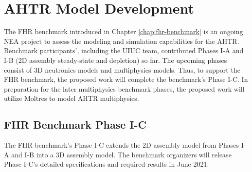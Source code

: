 \section{AHTR Model Development}
The \gls{FHR} benchmark introduced in Chapter \ref{chap:fhr-benchmark} is an 
ongoing \gls{NEA} project to assess the modeling and simulation capabilities 
for the \gls{AHTR}. 
Benchmark participants', including the \gls{UIUC} team, contributed Phases I-A 
and I-B (2D assembly steady-state and depletion) so far.  
The upcoming phases consist of 3D neutronics models and multiphysics models. 
Thus, to support the \gls{FHR} benchmark, the proposed work will complete the 
benchmark's Phase I-C.
In preparation for the later multiphysics benchmark phases, the proposed 
work will utilize Moltres to model \gls{AHTR} multiphysics.

\subsection{FHR Benchmark Phase I-C}
The \gls{FHR} benchmark's Phase I-C extends the 2D assembly model from Phases 
I-A and I-B into a 3D assembly model. 
The benchmark organizers will release Phase I-C's detailed specifications and 
required results in June 2021.

